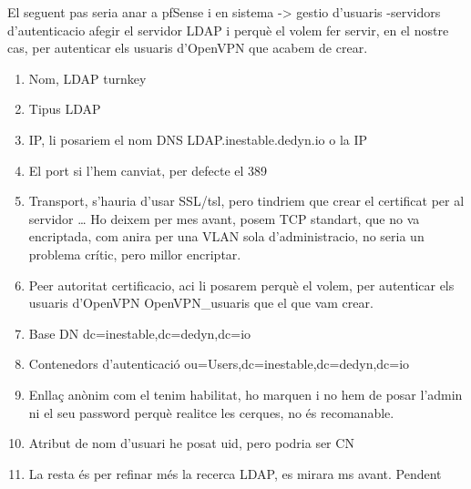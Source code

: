 \documentclass[
  10pt,
]{krantz}
\providecommand{\tightlist}{%
  \setlength{\itemsep}{0pt}\setlength{\parskip}{0pt}}
\begin{document}
El seguent pas seria anar a pfSense i en sistema -\textgreater{} gestio d'usuaris -servidors d'autenticacio afegir el servidor LDAP i perquè el volem fer servir, en el nostre cas, per autenticar els usuaris d'OpenVPN que acabem de crear.

\begin{enumerate}
\def\labelenumi{\arabic{enumi}.}
\tightlist
\item
  Nom, LDAP turnkey
\item
  Tipus LDAP
\item
  IP, li posariem el nom DNS LDAP.inestable.dedyn.io o la IP
\item
  El port si l'hem canviat, per defecte el 389
\item
  Transport, s'hauria d'usar SSL/tsl, pero tindriem que crear el certificat per al servidor \ldots{} Ho deixem per mes avant, posem TCP standart, que no va encriptada, com anira per una VLAN sola d'administracio, no seria un problema crític, pero millor encriptar.
\item
  Peer autoritat certificacio, aci li posarem perquè el volem, per autenticar els usuaris d'OpenVPN OpenVPN\_usuaris que el que vam crear.
\item
  Base DN dc=inestable,dc=dedyn,dc=io
\item
  Contenedors d'autenticació ou=Users,dc=inestable,dc=dedyn,dc=io
\item
  Enllaç anònim com el tenim habilitat, ho marquen i no hem de posar l'admin ni el seu password perquè realitce les cerques, no és recomanable.
\item
  Atribut de nom d'usuari he posat uid, pero podria ser CN
\item
  La resta és per refinar més la recerca LDAP, es mirara ms avant. Pendent
\end{enumerate}
\end{document}
